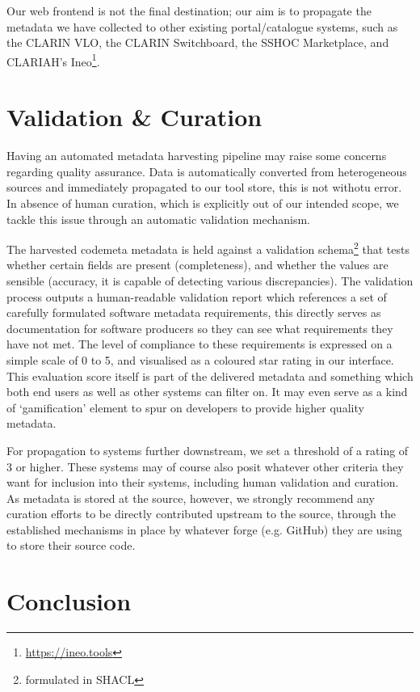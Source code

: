 \documentclass[a4paper,11pt]{article}
\begin{document}
Our web frontend is not the final destination; our aim is to propagate the metadata
we have collected to other existing portal/catalogue systems, such as the
CLARIN VLO, the CLARIN Switchboard, the SSHOC Marketplace, and CLARIAH's Ineo\footnote{\url{https://ineo.tools}}.

\section{Validation \& Curation}

Having an automated metadata harvesting pipeline may raise some concerns
regarding quality assurance. Data is automatically converted from heterogeneous
sources and immediately propagated to our tool store, this is not withotu
error. In absence of human curation, which is explicitly out of our intended
scope, we tackle this issue through an automatic validation mechanism.

The harvested codemeta metadata is held against a validation
schema\footnote{formulated in SHACL} that tests whether certain fields are
present (completeness), and whether the values are sensible (accuracy, it is
capable of detecting various discrepancies). The validation process outputs a
human-readable validation report which references a set of carefully formulated
software metadata requirements, this directly serves as documentation for
software producers so they can see what requirements they have not met. The
level of compliance to these requirements is expressed on a simple scale of 0
to 5, and visualised as a coloured star rating in our interface. This evaluation
score itself is part of the delivered metadata and something which both end
users as well as other systems can filter on. It may even serve as a kind of
`gamification' element to spur on developers to provide higher quality
metadata. 

For propagation to systems further downstream, we set a threshold of a rating
of 3 or higher. These systems may of course also posit whatever other criteria
they want for inclusion into their systems, including human validation and
curation. As metadata is stored at the source, however, we strongly recommend
any curation efforts to be directly contributed upstream to the source, through
the established mechanisms in place by whatever forge (e.g. GitHub) they are
using to store their source code.

\section{Conclusion}
\end{document}
